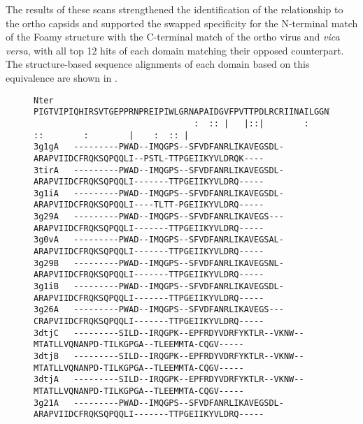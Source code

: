 The results of these scans strengthened the identification
of the relationship to the ortho capsids and supported the swapped specificity for the N-terminal
match of the Foamy structure with the C-terminal match of the ortho virus and {\em vica versa}, with all
top 12 hits of each domain matching their opposed counterpart.
The structure-based sequence alignments of each domain based on this equivalence are shown in .

\begin{figure}
\centering
\begin{singlespace}
\begin{tiny}
\begin{Verbatim}[frame=single]
Nter    PIGTVIPIQHIRSVTGEPPRNPREIPIWLGRNAPAIDGVFPVTTPDLRCRIINAILGGNIGLSLTPGDCLTWDSAVATLFIRTHGTFP
                                :  :: |   |::|        :    ::        :        |    :  :: |      
3g1gA   ---------PWAD--IMQGPS--SFVDFANRLIKAVEGSDL-ARAPVIIDCFRQKSQPQQLI--PSTL-TTPGEIIKYVLDRQK----
3tirA   ---------PWAD--IMQGPS--SFVDFANRLIKAVEGSDL-ARAPVIIDCFRQKSQPQQLI-------TTPGEIIKYVLDRQ-----
3g1iA   ---------PWAD--IMQGPS--SFVDFANRLIKAVEGSDL-ARAPVIIDCFRQKSQPQQLI----TLTT-PGEIIKYVLDRQ-----
3g29A   ---------PWAD--IMQGPS--SFVDFANRLIKAVEGS---ARAPVIIDCFRQKSQPQQLI-------TTPGEIIKYVLDRQ-----
3g0vA   ---------PWAD--IMQGPS--SFVDFANRLIKAVEGSAL-ARAPVIIDCFRQKSQPQQLI-------TTPGEIIKYVLDRQ-----
3g29B   ---------PWAD--IMQGPS--SFVDFANRLIKAVEGSNL-ARAPVIIDCFRQKSQPQQLI-------TTPGEIIKYVLDRQ-----
3g1iB   ---------PWAD--IMQGPS--SFVDFANRLIKAVEGSDL-ARAPVIIDCFRQKSQPQQLI-------TTPGEIIKYVLDRQ-----
3g26A   ---------PWAD--IMQGPS--SFVDFANRLIKAVEGS---CRAPVIIDCFRQKSQPQQLI-------TTPGEIIKYVLDRQ-----
3dtjC   ---------SILD--IRQGPK--EPFRDYVDRFYKTLR--VKNW--MTATLLVQNANPD-TILKGPGA--TLEEMMTA-CQGV-----
3dtjB   ---------SILD--IRQGPK--EPFRDYVDRFYKTLR--VKNW--MTATLLVQNANPD-TILKGPGA--TLEEMMTA-CQGV-----
3dtjA   ---------SILD--IRQGPK--EPFRDYVDRFYKTLR--VKNW--MTATLLVQNANPD-TILKGPGA--TLEEMMTA-CQGV-----
3g21A   ---------PWAD--IMQGPS--SFVDFANRLIKAVEGSDL-ARAPVIIDCFRQKSQPQQLI-------TTPGEIIKYVLDRQ-----


\end{Verbatim}
\end{tiny}
\end{singlespace}
\end{figure}
